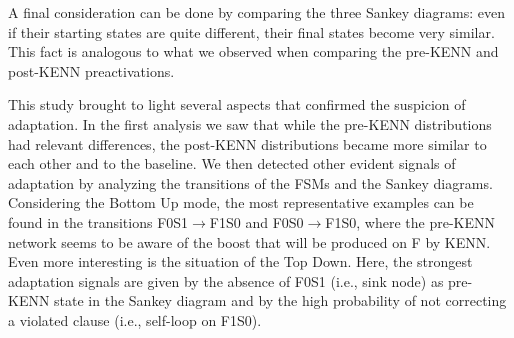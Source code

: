 A final consideration can be done by comparing the three Sankey diagrams: even if their starting states are quite different, their final states become very similar. This fact is analogous to what we observed when comparing the pre-KENN and post-KENN preactivations.

This study brought to light several aspects that confirmed the suspicion of adaptation. In the first analysis we saw that while the pre-KENN distributions had relevant differences, the post-KENN distributions became more similar to each other and to the baseline. We then detected other evident signals of adaptation by analyzing the transitions of the FSMs and the Sankey diagrams. Considering the Bottom Up mode, the most representative examples can be found in the transitions F0S1$\to$F1S0 and F0S0$\to$F1S0, where the pre-KENN network seems to be aware of the boost that will be produced on F by KENN. Even more interesting is the situation of the Top Down. Here, the strongest adaptation signals are given by the absence of F0S1 (i.e., sink node) as pre-KENN state in the Sankey diagram and by the high probability of not correcting a violated clause (i.e., self-loop on F1S0).